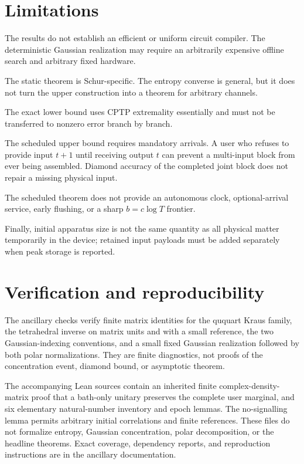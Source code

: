 \documentclass[11pt,a4paper]{article}
\numberwithin{equation}{section}
\begin{document}
\section{Limitations}\label{limitations}

The results do not establish an efficient or uniform circuit compiler.
The deterministic Gaussian realization may require an arbitrarily
expensive offline search and arbitrary fixed hardware.

The static theorem is Schur-specific. The entropy converse is general,
but it does not turn the upper construction into a theorem for arbitrary
channels.

The exact lower bound uses CPTP extremality essentially and must not be
transferred to nonzero error branch by branch.

The scheduled upper bound requires mandatory arrivals. A user who
refuses to provide input \(t+1\) until receiving output \(t\) can
prevent a multi-input block from ever being assembled. Diamond accuracy
of the completed joint block does not repair a missing physical input.

The scheduled theorem does not provide an autonomous clock,
optional-arrival service, early flushing, or a sharp \(b=c\log T\)
frontier.

Finally, initial apparatus size is not the same quantity as all physical
matter temporarily in the device; retained input payloads must be added
separately when peak storage is reported.

\section*{Verification and
reproducibility}\label{verification-and-reproducibility}

The ancillary checks verify finite matrix identities for the ququart
Kraus family, the tetrahedral inverse on matrix units and with a small
reference, the two Gaussian-indexing conventions, and a small fixed
Gaussian realization followed by both polar normalizations. They are
finite diagnostics, not proofs of the concentration event, diamond
bound, or asymptotic theorem.

The accompanying Lean sources contain an inherited finite
complex-density-matrix proof that a bath-only unitary preserves the
complete user marginal, and six elementary natural-number inventory and
epoch lemmas. The no-signalling lemma permits arbitrary initial
correlations and finite references. These files do not formalize
entropy, Gaussian concentration, polar decomposition, or the headline
theorems. Exact coverage, dependency reports, and reproduction
instructions are in the ancillary documentation.
\end{document}
